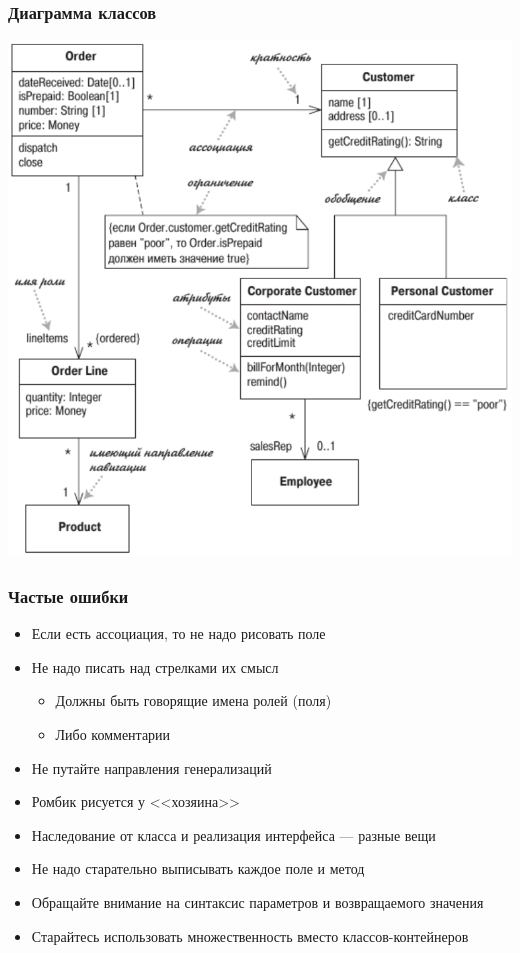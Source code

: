 \documentclass{../../slides-style}
\begin{document}
    \begin{frame}[plain]
        \titlepage
    \end{frame}

    \begin{frame}
        \frametitle{Диаграмма классов}
        \begin{center}
            \includegraphics[height=0.8\textheight]{umlClassDiagram.png}
        \end{center}
    \end{frame}

    \begin{frame}
        \frametitle{Частые ошибки}
        \begin{itemize}
            \item Если есть ассоциация, то не надо рисовать поле
            \item Не надо писать над стрелками их смысл
            \begin{itemize}
                \item Должны быть говорящие имена ролей (поля)
                \item Либо комментарии
            \end{itemize}
            \item Не путайте направления генерализаций
            \item Ромбик рисуется у <<хозяина>>
            \item Наследование от класса и реализация интерфейса --- разные вещи
            \item Не надо старательно выписывать каждое поле и метод
            \item Обращайте внимание на синтаксис параметров и возвращаемого значения
            \item Старайтесь использовать множественность вместо классов-контейнеров
        \end{itemize}
    \end{frame}
\end{document}
